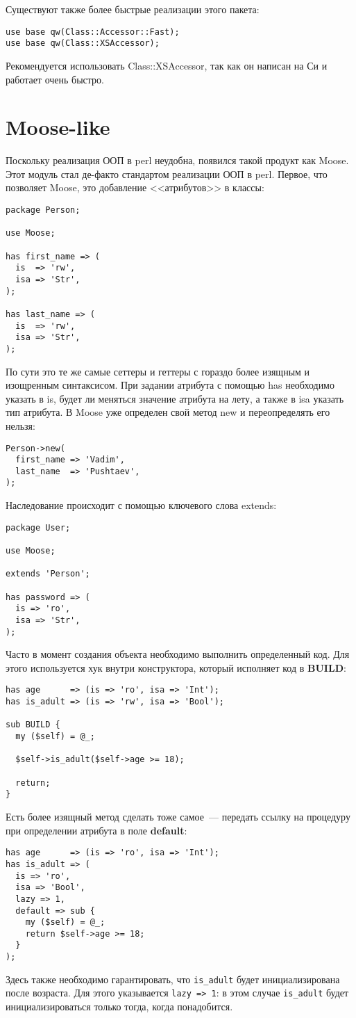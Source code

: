 Существуют также более быстрые реализации этого пакета:
\begin{verbatim}
use base qw(Class::Accessor::Fast);
use base qw(Class::XSAccessor);
\end{verbatim}
Рекомендуется использовать Class::XSAccessor, так как он написан на Си и работает очень быстро.

\section{Moose-like} %
Поскольку реализация ООП в perl неудобна, появился такой продукт как Moose. Этот модуль стал де-факто стандартом реализации ООП в perl. Первое, что позволяет Moose, это добавление <<атрибутов>> в классы:
\begin{verbatim}
package Person;

use Moose;

has first_name => (
  is  => 'rw',
  isa => 'Str',
);

has last_name => (
  is  => 'rw',
  isa => 'Str',
);
\end{verbatim}
По сути это те же самые сеттеры и геттеры с гораздо более изящным и изощренным синтаксисом. При задании атрибута с помощью has необходимо указать в is, будет ли меняться значение атрибута на лету, а также в isa указать тип атрибута. В Moose уже определен свой метод new и переопределять его нельзя:
\begin{verbatim}
Person->new(
  first_name => 'Vadim',
  last_name  => 'Pushtaev',
);
\end{verbatim}
Наследование происходит с помощью ключевого слова extends:
\begin{verbatim}
package User;

use Moose;

extends 'Person';

has password => (
  is => 'ro',
  isa => 'Str',
);
\end{verbatim}
Часто в момент создания объекта необходимо выполнить определенный код. Для этого используется хук внутри конструктора, который исполняет код в \textbf{BUILD}:
\begin{verbatim}
has age      => (is => 'ro', isa => 'Int');
has is_adult => (is => 'rw', isa => 'Bool');

sub BUILD {
  my ($self) = @_;

  $self->is_adult($self->age >= 18);

  return;
}
\end{verbatim}
Есть более изящный метод сделать тоже самое~--- передать ссылку на процедуру при определении атрибута в поле \textbf{default}:
\begin{verbatim}
has age      => (is => 'ro', isa => 'Int');
has is_adult => (
  is => 'ro',
  isa => 'Bool',
  lazy => 1,
  default => sub {
    my ($self) = @_;
    return $self->age >= 18;
  }
);
\end{verbatim}
Здесь также необходимо гарантировать, что \verb|is_adult| будет инициализирована после возраста. Для этого указывается \verb|lazy => 1|: в этом случае \verb|is_adult| будет инициализироваться только тогда, когда понадобится.

